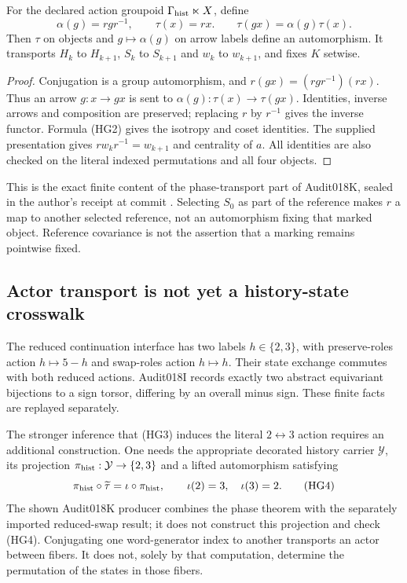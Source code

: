 \begin{proposition}\label{prop:phasegroupoid}
For the declared action groupoid $\Gamma_{\rm hist}\ltimes X$, define
\begin{equation}
\alpha(g)=rgr^{-1},\qquad \tau(x)=rx.
\qquad \tau(gx)=\alpha(g)\tau(x).
\tag{HG3}\label{eq:phasegroupoidautomorphism}
\end{equation}
Then $\tau$ on objects and $g\mapsto\alpha(g)$ on arrow labels define an automorphism. It transports $H_k$ to $H_{k+1}$, $S_k$ to $S_{k+1}$ and $w_k$ to $w_{k+1}$, and fixes $K$ setwise.
\end{proposition}
\begin{proof}
Conjugation is a group automorphism, and $r(gx)=(rgr^{-1})(rx)$. Thus an arrow $g:x\to gx$ is sent to $\alpha(g):\tau(x)\to\tau(gx)$. Identities, inverse arrows and composition are preserved; replacing $r$ by $r^{-1}$ gives the inverse functor. Formula (HG2) gives the isotropy and coset identities. The supplied presentation gives $r w_k r^{-1}=w_{k+1}$ and centrality of $a$. All identities are also checked on the literal indexed permutations and all four objects.
\end{proof}
This is the exact finite content of the phase-transport part of Audit018K, sealed in the author's receipt at commit . Selecting $S_0$ as part of the reference makes $r$ a map to another selected reference, not an automorphism fixing that marked object. Reference covariance is not the assertion that a marking remains pointwise fixed.

\subsection*{Actor transport is not yet a history-state crosswalk}
The reduced continuation interface has two labels $h\in\{2,3\}$, with preserve-roles action $h\mapsto5-h$ and swap-roles action $h\mapsto h$. Their state exchange commutes with both reduced actions. Audit018I records exactly two abstract equivariant bijections to a sign torsor, differing by an overall minus sign. These finite facts are replayed separately.

The stronger inference that (HG3) induces the literal $2\leftrightarrow3$ action requires an additional construction. One needs the appropriate decorated history carrier $\mathcal Y$, its projection $\pi_{\rm hist}:\mathcal Y\to\{2,3\}$ and a lifted automorphism satisfying
\begin{equation}
\pi_{\rm hist}\circ\widetilde\tau=\iota\circ\pi_{\rm hist},
\qquad \iota(2)=3,\quad\iota(3)=2.
\tag{HG4}\label{eq:decoratedhistorytarget}
\end{equation}
The shown Audit018K producer combines the phase theorem with the separately imported reduced-swap result; it does not construct this projection and check (HG4). Conjugating one word-generator index to another transports an actor between fibers. It does not, solely by that computation, determine the permutation of the states in those fibers.

